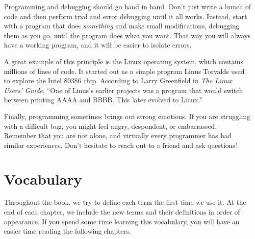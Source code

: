 Programming and debugging should go hand in hand.
Don't just write a bunch of code and then perform trial and error debugging until it all works.
Instead, start with a program that does {\em something} and make small modifications, debugging them as you go, until the program does what you want.
That way you will always have a working program, and it will be easier to isolate errors.


A great example of this principle is the Linux operating system, which contains millions of lines of code.
It started out as a simple program Linus Torvalds used to explore the Intel 80386 chip.
According to Larry Greenfield in {\it The Linux Users' Guide}, ``One of Linus's earlier projects was a program that would switch between printing AAAA and BBBB.
This later evolved to Linux.''


Finally, programming sometimes brings out strong emotions.
If you are struggling with a difficult bug, you might feel angry, despondent, or embarrassed.
Remember that you are not alone, and virtually every programmer has had similar experiences.
Don't hesitate to reach out to a friend and ask questions!



\section{Vocabulary}

Throughout the book, we try to define each term the first time we use it.
At the end of each chapter, we include the new terms and their definitions in order of appearance.
If you spend some time learning this vocabulary, you will have an easier time reading the following chapters.

